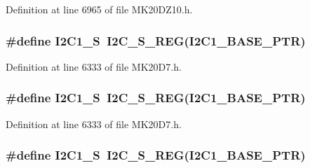 Definition at line 6965 of file M\+K20\+D\+Z10.\+h.

\subsubsection[{\texorpdfstring{I2\+C1\+\_\+S}{I2C1_S}}]{\setlength{\rightskip}{0pt plus 5cm}\#define I2\+C1\+\_\+S~{\bf I2\+C\+\_\+\+S\+\_\+\+R\+EG}({\bf I2\+C1\+\_\+\+B\+A\+S\+E\+\_\+\+P\+TR})}\hypertarget{group___i2_c___register___accessor___macros_gae095b0f00b8617e16ee1a798d8a07e19}{}\label{group___i2_c___register___accessor___macros_gae095b0f00b8617e16ee1a798d8a07e19}


Definition at line 6333 of file M\+K20\+D7.\+h.

\subsubsection[{\texorpdfstring{I2\+C1\+\_\+S}{I2C1_S}}]{\setlength{\rightskip}{0pt plus 5cm}\#define I2\+C1\+\_\+S~{\bf I2\+C\+\_\+\+S\+\_\+\+R\+EG}({\bf I2\+C1\+\_\+\+B\+A\+S\+E\+\_\+\+P\+TR})}\hypertarget{group___i2_c___register___accessor___macros_gae095b0f00b8617e16ee1a798d8a07e19}{}\label{group___i2_c___register___accessor___macros_gae095b0f00b8617e16ee1a798d8a07e19}


Definition at line 6333 of file M\+K20\+D7.\+h.

\subsubsection[{\texorpdfstring{I2\+C1\+\_\+S}{I2C1_S}}]{\setlength{\rightskip}{0pt plus 5cm}\#define I2\+C1\+\_\+S~{\bf I2\+C\+\_\+\+S\+\_\+\+R\+EG}({\bf I2\+C1\+\_\+\+B\+A\+S\+E\+\_\+\+P\+TR})}\hypertarget{group___i2_c___register___accessor___macros_gae095b0f00b8617e16ee1a798d8a07e19}{}\label{group___i2_c___register___accessor___macros_gae095b0f00b8617e16ee1a798d8a07e19}


